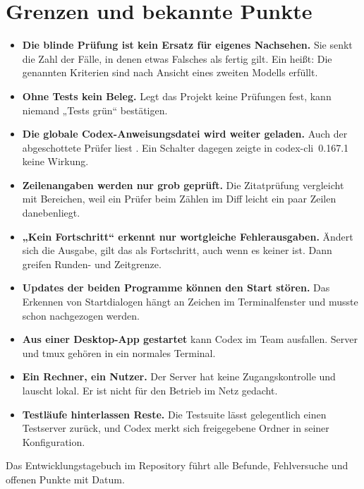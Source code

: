 \documentclass[a4paper,10pt,parskip=half-,headings=small]{scrartcl}
\newcommand{\code}[1]{\texttt{\detokenize{#1}}}
\begin{document}
\section{Grenzen und bekannte Punkte}\label{sec:grenzen}

\begin{itemize}
\item \textbf{Die blinde Prüfung ist kein Ersatz für eigenes Nachsehen.} Sie senkt die Zahl der
  Fälle, in denen etwas Falsches als fertig gilt. Ein \code{ACCEPTED} heißt: Die genannten Kriterien
  sind nach Ansicht eines zweiten Modells erfüllt.
\item \textbf{Ohne Tests kein Beleg.} Legt das Projekt keine Prüfungen fest, kann niemand „Tests
  grün“ bestätigen.
\item \textbf{Die globale Codex-Anweisungsdatei wird weiter geladen.} Auch der abgeschottete Prüfer
  liest \code{~/.codex/AGENTS.md}. Ein Schalter dagegen zeigte in codex-cli~0.167.1 keine Wirkung.
\item \textbf{Zeilenangaben werden nur grob geprüft.} Die Zitatprüfung vergleicht mit Bereichen, weil
  ein Prüfer beim Zählen im Diff leicht ein paar Zeilen danebenliegt.
\item \textbf{„Kein Fortschritt“ erkennt nur wortgleiche Fehlerausgaben.} Ändert sich die Ausgabe,
  gilt das als Fortschritt, auch wenn es keiner ist. Dann greifen Runden- und Zeitgrenze.
\item \textbf{Updates der beiden Programme können den Start stören.} Das Erkennen von Startdialogen
  hängt an Zeichen im Terminalfenster und musste schon nachgezogen werden.
\item \textbf{Aus einer Desktop-App gestartet} kann Codex im Team ausfallen. Server und tmux gehören
  in ein normales Terminal.
\item \textbf{Ein Rechner, ein Nutzer.} Der Server hat keine Zugangskontrolle und lauscht lokal. Er
  ist nicht für den Betrieb im Netz gedacht.
\item \textbf{Testläufe hinterlassen Reste.} Die Testsuite lässt gelegentlich einen Testserver
  zurück, und Codex merkt sich freigegebene Ordner in seiner Konfiguration.
\end{itemize}

Das Entwicklungstagebuch \code{NEXT.md} im Repository führt alle Befunde, Fehlversuche und offenen
Punkte mit Datum.

\end{document}
